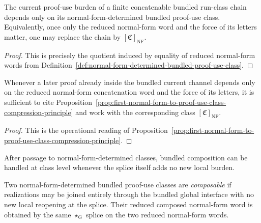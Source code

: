 \begin{proposition}
\label{prop:first-normal-form-to-proof-use-class-compression-principle}
The current proof-use burden of a finite concatenable bundled run-class chain depends only on its normal-form-determined bundled proof-use class. Equivalently, once only the reduced normal-form word and the force of its letters matter, one may replace the chain by $[\mathfrak C]_{\operatorname{NF}}$.
\end{proposition}

\begin{proof}
This is precisely the quotient induced by equality of reduced normal-form words from Definition~\ref{def:normal-form-determined-bundled-proof-use-class}.
\end{proof}

\begin{corollary}
\label{cor:use-rule-for-the-first-normal-form-to-proof-use-class-compression-principle}
Whenever a later proof already inside the bundled current channel depends only on the reduced normal-form concatenation word and the force of its letters, it is sufficient to cite Proposition~\ref{prop:first-normal-form-to-proof-use-class-compression-principle} and work with the corresponding class $[\mathfrak C]_{\operatorname{NF}}$.
\end{corollary}

\begin{proof}
This is the operational reading of Proposition~\ref{prop:first-normal-form-to-proof-use-class-compression-principle}.
\end{proof}

\begin{remark}
\label{rem:status-of-the-first-proof-use-class-composition-step}
After passage to normal-form-determined classes, bundled composition can be handled at class level whenever the splice itself adds no new local burden.
\end{remark}

\begin{definition}
\label{def:composable-normal-form-determined-bundled-proof-use-classes}
Two normal-form-determined bundled proof-use classes are \emph{composable} if realizations may be joined entirely through the bundled global interface with no new local reopening at the splice. Their reduced composed normal-form word is obtained by the same $\star_{\mathrm G}$ splice on the two reduced normal-form words.
\end{definition}

